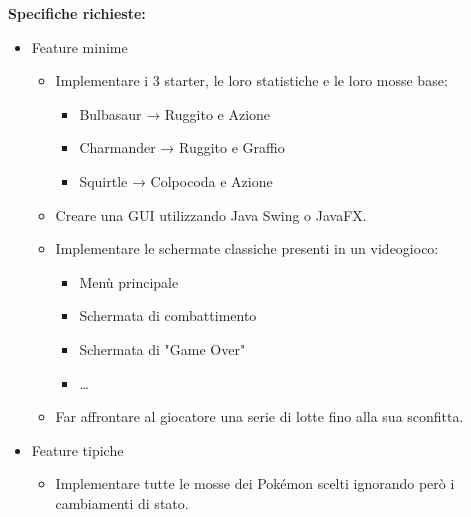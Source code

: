 \documentclass{article}
\begin{document}
\textbf{Specifiche richieste:}
\begin{itemize}

    \item Feature minime 

    \begin{itemize}
    \setlength\itemsep{1em}

        \item Implementare i 3 starter, le loro statistiche e le loro mosse base: {\color{green}\checkmark} 
        
            \begin{itemize}
                \item Bulbasaur → Ruggito e Azione
                \item Charmander → Ruggito e Graffio
                \item Squirtle → Colpocoda e Azione
            \end{itemize}
    
        \item Creare una GUI utilizzando Java Swing o JavaFX. {\color{green}\checkmark}
        
        \item Implementare le schermate classiche presenti in un videogioco: {\color{green}\checkmark}
        
                \begin{itemize}
                \item Menù principale
                \item Schermata di combattimento
                \item Schermata di "Game Over"
                \item \ldots
            \end{itemize}

        \item Far affrontare al giocatore una serie di lotte fino alla sua sconfitta. {\color{green}\checkmark}

    \end{itemize}

    \item Feature tipiche

        \begin{itemize}
        \setlength\itemsep{1em}
        
            \item Implementare tutte le mosse dei Pokémon scelti ignorando però i cambiamenti di stato. {\color{yellow}\checkmark}


\end{itemize}
\end{itemize}
\end{document}
